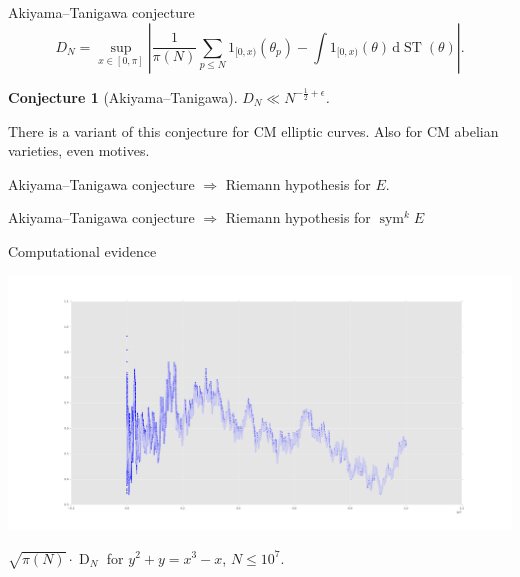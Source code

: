 \documentclass{beamer}
\DeclareMathOperator{\D}{D}
\DeclareMathOperator{\ST}{ST}
\DeclareMathOperator{\sym}{sym}
\newcommand{\dd}{\mathrm{d}}
\newtheorem{conjecture}{Conjecture}
\begin{document}
\begin{frame}{Akiyama--Tanigawa conjecture}
\[
	D_N = \sup_{x\in [0,\pi]}\left| \frac{1}{\pi(N)} \sum_{p\leqslant N} 1_{[0,x)}(\theta_p) - \int 1_{[0,x)}(\theta) \, \dd\ST(\theta)\right| .
\]
\pause

\begin{conjecture}[Akiyama--Tanigawa]
$D_N \ll N^{-\frac 1 2 + \epsilon}$. 
\end{conjecture}
\pause

There is a variant of this conjecture for CM elliptic curves.
\pause
Also for CM abelian varieties, 
\pause
even motives.
\pause

\begin{theorem}
Akiyama--Tanigawa conjecture $\Rightarrow$ Riemann hypothesis for $E$.
\end{theorem}
\pause

\begin{theorem}[Mazur]
Akiyama--Tanigawa conjecture $\Rightarrow$ Riemann hypothesis for $\sym^k E$
\end{theorem}
\end{frame}



\begin{frame}{Computational evidence}
\begin{center}
\includegraphics[width=\textwidth]{11a1}

$\sqrt{\pi(N)} \cdot \D_N$ for $y^2 + y = x^3 - x$, $N\leqslant 10^7$.
\end{center}
\end{frame}
\end{document}
